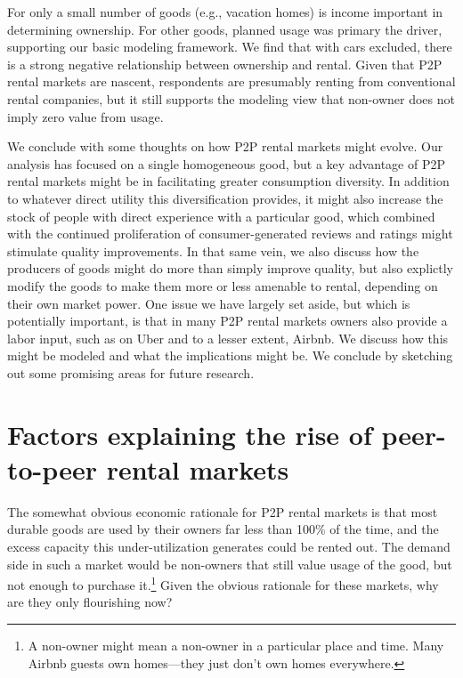 \documentclass[11pt]{article}
\begin{document}
For only a small number of goods (e.g., vacation homes) is income important in determining ownership. 
For other goods, planned usage was primary the driver, supporting our basic modeling framework.  
We find that with cars excluded, there is a strong negative relationship between ownership and rental. 
Given that P2P rental markets are nascent, respondents are presumably renting from conventional rental companies, but it still supports the modeling view that non-owner does not imply zero value from usage. 

We conclude with some thoughts on how P2P rental markets might evolve.
Our analysis has focused on a single homogeneous good, but a key advantage of P2P rental markets might be in facilitating greater consumption diversity. 
In addition to whatever direct utility this diversification provides, it might also increase the stock of people with direct experience with a particular good, which combined with the continued proliferation of consumer-generated reviews and ratings might stimulate quality improvements. 
In that same vein, we also discuss how the producers of goods might do more than simply improve quality, but also explictly modify the goods to make them more or less amenable to rental, depending on their own market power. 
One issue we have largely set aside, but which is potentially important, is that in many P2P rental markets owners also provide a labor input, such as on Uber and to a lesser extent, Airbnb.
We discuss how this might be modeled and what the implications might be. 
We conclude by sketching out some promising areas for future research. 
 
\section{Factors explaining the rise of peer-to-peer rental markets}

The somewhat obvious economic rationale for P2P rental markets is that most durable goods are used by their owners far less than 100\% of the time, and the excess capacity this under-utilization generates could be rented out.
The demand side in such a market would be non-owners that still value usage of the good, but not enough to purchase it.\footnote{
A non-owner might mean a non-owner in a particular place and time. 
Many Airbnb guests own homes---they just don't own homes everywhere. 
} 
Given the obvious rationale for these markets, why are they only flourishing now? 
\end{document}
